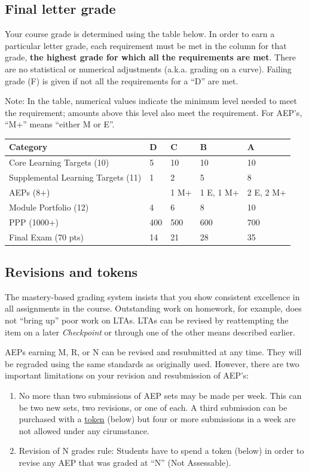 \hypertarget{final-letter-grade}{%
\subsection{Final letter grade}\label{final-letter-grade}}

Your course grade is determined using the table below. In order to earn
a particular letter grade, each requirement must be met in the column
for that grade, \textbf{the highest grade for which all the requirements
are met}. There are no statistical or numerical adjustments (a.k.a.
grading on a curve). Failing grade (F) is given if not all the
requirements for a ``D'' are met.

Note: In the table, numerical values indicate the minimum level needed
to meet the requirement; amounts above this level also meet the
requirement. For AEP's, ``M+'' means ``either M or E''.

\begin{longtable}[]{@{}lllll@{}}
\toprule
Category & D & C & B & A\tabularnewline
\midrule
\endhead
Core Learning Targets (10) & 5 & 10 & 10 & 10\tabularnewline
Supplemental Learning Targets (11) & 1 & 2 & 5 & 8\tabularnewline
AEPs (8+) & & 1 M+ & 1 E, 1 M+ & 2 E, 2 M+\tabularnewline
Module Portfolio (12) & 4 & 6 & 8 & 10\tabularnewline
PPP (1000+) & 400 & 500 & 600 & 700\tabularnewline
Final Exam (70 pts) & 14 & 21 & 28 & 35\tabularnewline
\bottomrule
\end{longtable}

\hypertarget{revisions}{%
\subsection{Revisions and tokens}\label{revisions}}

The mastery-based grading system insists that you show consistent
excellence in all assignments in the course. Outstanding work on
homework, for example, does not ``bring up'' poor work on LTAs. LTAs can
be revised by reattempting the item on a later \emph{Checkpoint} or
through one of the other means described earlier.

AEPs earning M, R, or N can be revised and resubmitted at any time. They
will be regraded using the same standards as originally used. However,
there are two important limitations on your revision and resubmission of
AEP's:

\begin{enumerate}
\def\labelenumi{\arabic{enumi}.}
\tightlist
\item
  No more than two submissions of AEP sets may be made per week. This
  can be two new sets, two revisions, or one of each. A third submission
  can be purchased with a \protect\hyperlink{tokens}{token} (below) but
  four or more submissions in a week are not allowed under any
  cirumstance.
\item
  Revision of N grades rule: Students have to spend a token (below) in
  order to revise any AEP that was graded at ``N'' (Not Assessable).
\end{enumerate}

